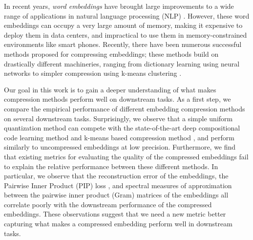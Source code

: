 In recent years, \textit{word embeddings} \citep{word2vec13,glove14,fasttext18} have brought large improvements to a wide range of applications in natural language processing (NLP) \citep{collins16,drqa17}.
However, these word embeddings can occupy a very large amount of memory, making it expensive to deploy them in data centers, and impractical to use them in memory-constrained environments like smart phones.
Recently, there have been numerous successful methods proposed for compressing embeddings;
these methods build on drastically different machineries, ranging from dictionary learning using neural networks \citep{dccl17,kway18} to simpler compression using k-means clustering  \citep{andrews16}. %

Our goal in this work is to gain a deeper understanding of what makes compression methods perform well on downstream tasks.
As a first step, we compare the empirical performance of different embedding compression methods on several downstream tasks.
Surprisingly, we observe that a simple uniform quantization method can compete with the state-of-the-art deep compositional code learning method \citep{dccl17} and k-means based compression method \citep{andrews16}, and perform similarly to uncompressed embeddings at low precision.
Furthermore, we find that existing metrics for evaluating the quality of the compressed embeddings fail to explain the relative performance between these different methods.
In particular, we observe that the reconstruction error of the embeddings, the Pairwise Inner Product (PIP) loss \citep{yin18}, and spectral measures of approximation between the pairwise inner product (Gram) matrices of the embeddings \citep{avron17,lprff18} all correlate poorly with the downstream performance of the compressed embeddings. 
These observations suggest that we need a new metric better capturing what makes a compressed embedding perform well in downstream tasks.

